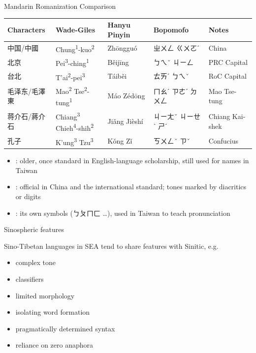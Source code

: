 \documentclass{beamer}
\newcommand{\tn}[1]{\textsuperscript{#1}}
\begin{document}
\begin{frame}{Mandarin Romanization Comparison}
  \begingroup\footnotesize\setlength{\tabcolsep}{2pt}
  \begin{tabular}{lllll}
Characters & Wade-Giles & Hanyu Pinyin & Bopomofo & Notes\\ \hline
中国/中國 & Chung\tn{1}-kuo\tn{2} & Zhōngguó & ㄓㄨㄥ ㄍㄨㄛˊ & China\\
北京 & Pei\tn{3}-ching\tn{1} & Běijīng & ㄅㄟˇ ㄐㄧㄥ & PRC Capital \\
台北 & T'ai\tn{2}-pei\tn{3} & Táiběi & ㄊㄞˊ ㄅㄟˇ & RoC Capital \\
毛泽东/毛澤東 & Mao\tn{2} Tse\tn{2}-tung\tn{1} & Máo Zédōng & ㄇㄠˊ ㄗㄜˊ ㄉㄨㄥ & Mao Tse-tung \\
蒋介石/蔣介石 & Chiang\tn{3} Chieh\tn{4}-shih\tn{2} & Jiǎng Jièshí & ㄐㄧㄤˇ ㄐㄧㄝˋ ㄕˊ & Chiang Kai-shek \\
孔子 & K'ung\tn{3} Tzu\tn{3} & Kǒng Zǐ & ㄎㄨㄥˇ ㄗˇ & Confucius \\
  \end{tabular}\endgroup
  \bigskip


  \begin{itemize}
  \item {}: older, once standard in English-language
    scholarship, still used for names in Taiwan
  \item {}: official in China and the international standard;
    tones marked by diacritics or digits
  \item {}: its own symbols (ㄅㄆㄇㄈ \ldots), used in
    Taiwan to teach pronunciation
  \end{itemize}
  

\end{frame}



\begin{frame}{Sinospheric features}

Sino-Tibetan languages in SEA tend to share features with Sinitic, e.g.

\begin{itemize}
\item complex tone
\item classifiers
\item limited morphology
\item isolating word formation
\item pragmatically determined syntax
\item reliance on zero anaphora
\end{itemize}
\end{frame}
\end{document}
